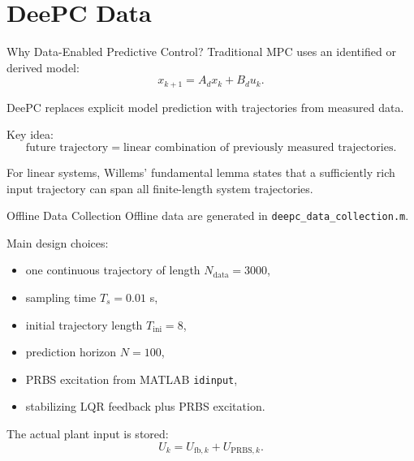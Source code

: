 \documentclass[aspectratio=169,11pt]{beamer}
\newcommand{\Tini}{T_{\mathrm{ini}}}
\newcommand{\Npred}{N}
\newcommand{\Ts}{T_s}
\begin{document}
\section{DeePC Data}

\begin{frame}{Why Data-Enabled Predictive Control?}
    Traditional MPC uses an identified or derived model:
    \[
    x_{k+1}=A_d x_k+B_d u_k.
    \]

    DeePC replaces explicit model prediction with trajectories from measured data.

    \vspace{0.4cm}
    Key idea:
    \[
    \text{future trajectory}
    =
    \text{linear combination of previously measured trajectories}.
    \]

    \vspace{0.3cm}
    For linear systems, Willems' fundamental lemma states that a sufficiently rich input trajectory can span all finite-length system trajectories.
\end{frame}

\begin{frame}{Offline Data Collection}
    Offline data are generated in \texttt{deepc\_data\_collection.m}.

    \vspace{0.3cm}
    Main design choices:
    \begin{itemize}
        \item one continuous trajectory of length $N_{\mathrm{data}}=3000$,
        \item sampling time $\Ts=0.01$ s,
        \item initial trajectory length $\Tini=8$,
        \item prediction horizon $\Npred=100$,
        \item PRBS excitation from MATLAB \texttt{idinput},
        \item stabilizing LQR feedback plus PRBS excitation.
    \end{itemize}

    \vspace{0.2cm}
    The actual plant input is stored:
    \[
    U_k = U_{\mathrm{fb},k}+U_{\mathrm{PRBS},k}.
    \]
\end{frame}
\end{document}
